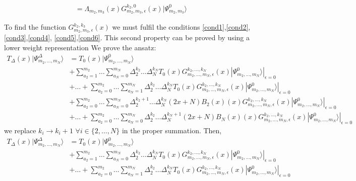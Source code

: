 \documentclass[11pt]{article}
\numberwithin{equation}{section}
\numberwithin{equation}{subsection}
\begin{document}
{\begin{enumerate}
\begin{equation}
\begin{split}
=
\Lambda_{m_{2},m_{3}}(x)G_{m_{2},m_{3},\epsilon}^{k_{2},0}(x)|\Psi_{m_{2},m_{3}}^{0}\rangle
\end{split}
\end{equation}
\end{enumerate}
To find the function $G_{m_{2},m_{3},\epsilon}^{k_{2},k_{3}}(x)$ we must fulfil the conditions \eqref{cond1},\eqref{cond2},\eqref{cond3},\eqref{cond4}, \eqref{cond5},\eqref{cond6}.
{\color{blue}This second property can be proved by using a lower weight representation }
We prove the ansatz:
\begin{align*}
	T_{\Delta}(x)|\Psi_{m_{2},\ldots,m_{N}}^{\Delta}\rangle&=T_{0}(x)|\Psi_{m_{2},\ldots,m_{N}}^{0}\rangle
	\\&+
	\sum_{a_{2}=1}^{m_{2}}\ldots\sum_{a_{N}=0}^{m_{N}}\Delta_{2}^{k_{2}}\ldots \Delta_{N}^{k_{N}}T_{0}(x)G_{m_{2},\ldots,m_{N},\epsilon}^{k_{2},\ldots,k_{N}}(x)|\Psi_{m_{2},\ldots,m_{N}}^{0}\rangle|_{\epsilon=0}
	\\&+\ldots+	\sum_{a_{2}=0}^{m_{2}}\ldots\sum_{a_{N}=1}^{m_{N}}\Delta_{2}^{k_{2}}\ldots \Delta_{N}^{k_{N}}T_{0}(x)G_{m_{2},\ldots,m_{N},\epsilon}^{k_{2},\ldots,k_{N}}(x)|\Psi_{m_{2},\ldots,m_{N}}^{0}\rangle|_{\epsilon=0} 
	\\&+\sum_{a_{2}=0}^{m_{2}}\ldots\sum_{a_{N}=0}^{m_{N}}\Delta_{2}^{k_{2}+1}\ldots \Delta_{N}^{k_{N}}(2x+N)B_{2}(x)(x)G_{m_{2},\ldots,m_{N},\epsilon}^{k_{2},\ldots,k_{N}}(x)|\Psi_{m_{2},\ldots,m_{N}}^{0}\rangle|_{\epsilon=0}
	\\&+\ldots +
	\sum_{a_{2}=0}^{m_{2}}\ldots\sum_{a_{N}=0}^{m_{N}}\Delta_{2}^{k_{2}}\ldots \Delta_{N}^{k_{N}+1}(2x+N)B_{N}(x)(x)G_{m_{2},\ldots,m_{N},\epsilon}^{k_{2},\ldots,k_{N}}(x)|\Psi_{m_{2},\ldots,m_{N}}^{0}\rangle|_{\epsilon=0}
\end{align*}
we replace $k_{i}\to k_{i}+1$ $\forall i\in\{2,\ldots,N\}$ in the proper summation. Then,
\begin{align*}
	T_{\Delta}(x)|\Psi_{m_{2},\ldots,m_{N}}^{\Delta}\rangle&=T_{0}(x)|\Psi_{m_{2},\ldots,m_{N}}^{0}\rangle
	\\&+
	\sum_{a_{2}=1}^{m_{2}}\ldots\sum_{a_{N}=0}^{m_{N}}\Delta_{2}^{k_{2}}\ldots \Delta_{N}^{k_{N}}T_{0}(x)G_{m_{2},\ldots,m_{N},\epsilon}^{k_{2},\ldots,k_{N}}(x)|\Psi_{m_{2},\ldots,m_{N}}^{0}\rangle|_{\epsilon=0}
	\\&+\ldots+	\sum_{a_{2}=0}^{m_{2}}\ldots\sum_{a_{N}=1}^{m_{N}}\Delta_{2}^{k_{2}}\ldots \Delta_{N}^{k_{N}}T_{0}(x)G_{m_{2},\ldots,m_{N},\epsilon}^{k_{2},\ldots,k_{N}}(x)|\Psi_{m_{2},\ldots,m_{N}}^{0}\rangle|_{\epsilon=0}

\end{align*}}
\end{document}
